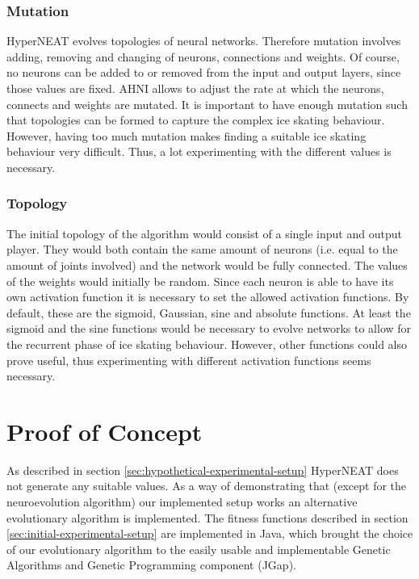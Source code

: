 \documentclass[a4paper,10pt]{article}
\begin{document}
\subsubsection{Mutation}
HyperNEAT evolves topologies of neural networks. Therefore mutation involves adding, removing and changing of neurons, connections and weights. Of course, no neurons can be added to or removed from the input and output layers, since those values are fixed. AHNI allows to adjust the rate at which the neurons, connects and weights are mutated. It is important to have enough mutation such that topologies can be formed to capture the complex ice skating behaviour. However, having too much mutation makes finding a suitable ice skating behaviour very difficult. Thus, a lot experimenting with the different values is necessary. 

\subsubsection{Topology}
The initial topology of the algorithm would consist of a single input and output player. They would both contain the same amount of neurons (i.e. equal to the amount of joints involved) and the network would be fully connected. The values of the weights would initially be random. Since each neuron is able to have its own activation function it is necessary to set the allowed activation functions. By default, these are the sigmoid, Gaussian, sine and absolute functions. At least the sigmoid and the sine functions would be necessary to evolve networks to allow for the recurrent phase of ice skating behaviour. However, other functions could also prove useful, thus experimenting with different activation functions seems necessary.

\section{Proof of Concept}
\label{sec:proof-of-concept}
As described in section \ref{sec:hypothetical-experimental-setup} HyperNEAT does not generate any suitable values. As a way of demonstrating that (except for the neuroevolution algorithm) our implemented setup works an alternative evolutionary algorithm is implemented. The fitness functions described in section \ref{sec:initial-experimental-setup} are implemented in Java, which brought the choice of our evolutionary algorithm to the easily usable and implementable Genetic Algorithms and Genetic Programming component (JGap). 
\end{document}

